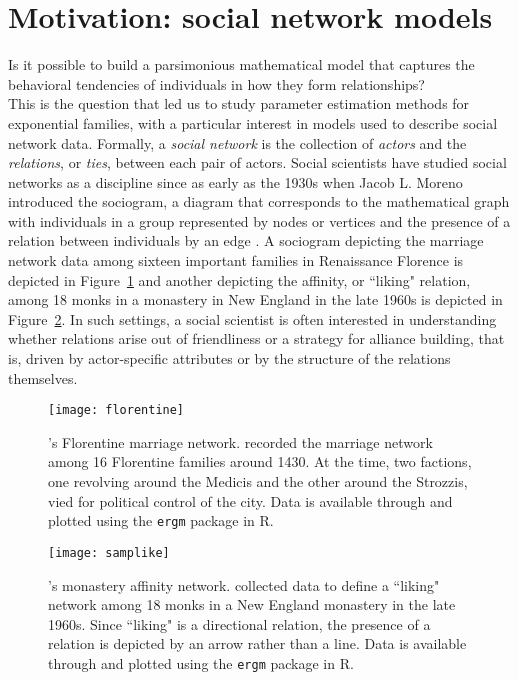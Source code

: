 \section{Motivation: social network models}
Is it possible to build a parsimonious mathematical model that captures the 
behavioral tendencies of individuals in how they form relationships?\\  %

This is the question that led us to study parameter estimation methods for exponential 
families, with a particular interest in models used to describe social network data.  
Formally, a \emph{social network} is the collection of \emph{actors} and the 
\emph{relations}, or \emph{ties}, between each pair of actors.
Social scientists have studied social networks as a discipline since as early as the 
1930s when Jacob L. Moreno introduced the sociogram, a diagram that corresponds to
the mathematical graph with individuals in a group 
represented by nodes or vertices and the presence of a relation between 
individuals by an edge \citep[Chapter 3]{Wasserman:1994}.  
A sociogram depicting the marriage network data among sixteen 
important families in Renaissance Florence \citep{Padgett} is depicted in 
Figure~\ref{F:Florentine} and another depicting the affinity, or ``liking" relation, among 18 
monks in a monastery in New England in the late 1960s \citep{Sampson} is depicted in 
Figure~\ref{F:Sampson}.  In such settings, a social scientist is often interested in 
understanding whether relations arise out of friendliness or a strategy for alliance 
building, that is, driven by actor-specific attributes or by the structure of  the relations themselves.
\begin{figure}
\begin{center}
\texttt{[image: florentine]} %
\end{center}
\caption[\citeauthor{Padgett}'s \citeyearpar{Padgett} Florentine marriage network]{
\citeauthor{Padgett}'s \citeyearpar{Padgett} Florentine marriage network.  \citeauthor{Padgett} recorded the marriage network among 16 Florentine families around 1430.  At the time, two factions, one revolving around the 
Medicis and the other around the Strozzis, vied for political control of the city.   
Data is available through and plotted using the \texttt{ergm} package \citep*{ergm:R} in 
R.}
\label{F:Florentine}
\end{figure}

\begin{figure}
\begin{center}
\texttt{[image: samplike]}
\end{center}
\caption[\citeauthor{Sampson}'s \citeyearpar{Sampson} monastery affinity network]
{\citeauthor{Sampson}'s \citeyearpar{Sampson} monastery affinity network.  \citeauthor{Sampson} collected data to define a ``liking" network among 18 monks 
in a New England monastery in the late 1960s.  Since ``liking" is a directional 
relation, the presence of a relation is depicted by an arrow rather than a line.  Data 
is available through and plotted using the \texttt{ergm} package \citep{ergm:R} in R.}
\label{F:Sampson}
\end{figure}


